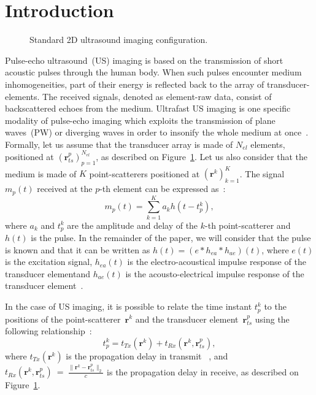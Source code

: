 \documentclass{article}
\newcommand{\vect}[1]{\bm{#1}}
\newcommand{\ser}[2]{#1^{#2}}
\theoremstyle{definition}
\begin{document}
\section{Introduction}
\label{sec_intro}
\begin{figure}[htb]
	\centering
	
	\caption{Standard 2D ultrasound imaging configuration.}
	\label{fig_pulse_echo}
\end{figure}
Pulse-echo ultrasound~(US) imaging is based on the transmission of short acoustic pulses through the human body. When such pulses encounter medium inhomogeneities, part of their energy is reflected back to the array of transducer-elements. The received signals, denoted as element-raw data, consist of backscattered echoes from the medium. Ultrafast US imaging is one specific modality of pulse-echo imaging which exploits the transmission of plane waves~(PW) or diverging waves in order to insonify the whole medium at once~\cite{Tanter_UFFC_2014}. Formally, let us assume that the transducer array is made of $N_{el}$ elements, positioned at $\left(\ser{\vect{r}_{ts}}{p}\right)_{p=1}^{N_{el}}$, as described on Figure~\ref{fig_pulse_echo}. Let us also consider that the medium is made of $K$ point-scatterers positioned at $\left(\vect{r}^k\right)_{k=1}^K$. The signal $m_{p} \left(t\right)$ received at the $p$-th element can be expressed as~\cite{Chernyakova2014, Tur_TSP_2012}:
\begin{equation}
\label{eq_raw_data_ultrafast}
m_{p} \left(t\right) = \sum \limits_{k=1}^{K} a_k h\left(t - \ser{t_p}{k}\right), 
\end{equation}
where $a_k$ and $\ser{t_p}{k}$ are the amplitude and delay of the $k$-th point-scatterer and $h\left(t\right)$ is the pulse. In the remainder of the paper, we will consider that the pulse is known and that it can be written as $h\left(t\right) = \left(e \ast h_{ea} \ast h_{ae}\right)\left(t\right)$, where $e\left(t\right)$ is the excitation signal, $h_{ea}\left(t\right)$ is the electro-acoustical impulse response of the transducer elementand $h_{ae}\left(t\right)$ is the acousto-electrical impulse response of the transducer element~\cite{Jensen_UFFC_1992}.

In the case of US imaging, it is possible to relate the time instant $\ser{t_p}{k}$ to the positions of the point-scatterer~$\ser{\vect{r}}{k}$ and the transducer element~$\ser{\vect{r}_{ts}}{p}$ using the following relationship~\cite{montaldo_uffc_2014}:
\begin{equation}
\label{eq_usdelay}
\ser{t_p}{k} = t_{Tx}\left(\vect{r}^k\right) + t_{Rx}\left(\vect{r}^k, \ser{\vect{r}_{ts}}{p}\right),
\end{equation}
where $t_{Tx}\left(\vect{r}^k\right)$ is the propagation delay in transmit ~\cite{montaldo_uffc_2014, Papadacci_UFFC_2014}, and $t_{Rx}\left(\vect{r}^k, \ser{\vect{r}_{ts}}{p}\right)~=~\frac{\|\vect{r}^k - \ser{\vect{r}_{ts}}{p}\|_2}{c}$ is the propagation delay in receive, as described on Figure~\ref{fig_pulse_echo}.
\end{document}
